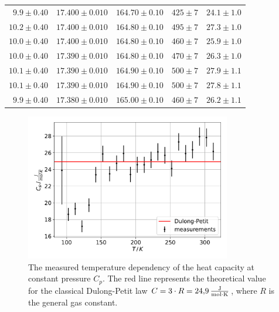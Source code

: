 \begin{table}
\begin{tabular}{r r r r r}
        $9.9\pm0.40$ & $17.400\pm0.010$ & $164.70\pm0.10$ & $425\pm7$ & $24.1\pm1.0$ \\
        $10.2\pm0.40$ & $17.400\pm0.010$ & $164.80\pm0.10$ & $495\pm7$ & $27.3\pm1.0$ \\
        $10.0\pm0.40$ & $17.400\pm0.010$ & $164.80\pm0.10$ & $460\pm7$ & $25.9\pm1.0$ \\
        $10.0\pm0.40$ & $17.390\pm0.010$ & $164.80\pm0.10$ & $470\pm7$ & $26.3\pm1.0$ \\
        $10.1\pm0.40$ & $17.390\pm0.010$ & $164.90\pm0.10$ & $500\pm7$ & $27.9\pm1.1$ \\
        $10.1\pm0.40$ & $17.390\pm0.010$ & $164.90\pm0.10$ & $500\pm7$ & $27.8\pm1.1$ \\
        $9.9\pm0.40$ & $17.380\pm0.010$ & $165.00\pm0.10$ & $460\pm7$ & $26.2\pm1.1$ \\
        \bottomrule
    \end{tabular}
\end{table}
\begin{figure}
    \centering
    \includegraphics[width=0.8\textwidth]{content/plots/C_p.pdf}
    \caption{The measured temperature dependency of the heat capacity at constant pressure $C_p$.
    The red line represents the theoretical value for the classical Dulong-Petit law $C = 3 \cdot R = \qty{24.9}{\frac{\joule}{\mol \cdot \kelvin}}$, where $R$ is the general gas constant.}
    \label{fig:C_p}
\end{figure}
\FloatBarrier

